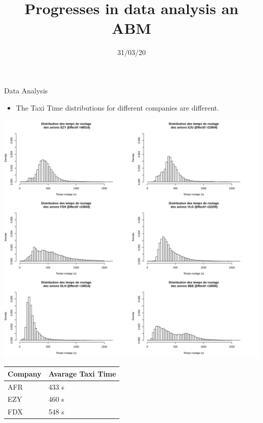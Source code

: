 \documentclass{beamer}
\title[Your Short Title]{Progresses in data analysis an ABM}
\date{31/03/20}
\begin{document}
	
	\begin{frame}
	\titlepage
\end{frame}


\begin{frame}{Data Analysis}
\begin{itemize}
	\item The Taxi Time distributions for different companies are different.
\end{itemize}
 \begin{minipage}{\textwidth}
	\begin{minipage}[b]{0.49\textwidth}
		\centering
		\includegraphics[scale=0.26]{taxiTimeCompanies.png}

	\end{minipage}
	\hfill
	\begin{minipage}[b]{0.3\linewidth}
		\centering
		\tiny
		\begin{tabular}{p{1cm}p{2cm}}\hline
			Company & Avarage Taxi Time \\ \hline
			AFR & 433 s \\
			EZY & 460 s \\
			FDX & 548 s \\ \hline
		\end{tabular}
\bigskip
\bigskip
\bigskip
\bigskip
\bigskip
\bigskip
\bigskip

	\end{minipage}
\end{minipage}
\end{frame}
\end{document}
